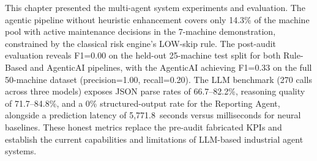 This chapter presented the multi-agent system experiments and evaluation. The agentic pipeline without heuristic enhancement covers only 14.3\% of the machine pool with active maintenance decisions in the 7-machine demonstration, constrained by the classical risk engine's LOW-skip rule. The post-audit evaluation reveals F1=0.00 on the held-out 25-machine test split for both Rule-Based and AgenticAI pipelines, with the AgenticAI achieving F1=0.33 on the full 50-machine dataset (precision=1.00, recall=0.20). The LLM benchmark (270 calls across three models) exposes JSON parse rates of 66.7--82.2\%, reasoning quality of 71.7--84.8\%, and a 0\% structured-output rate for the Reporting Agent, alongside a prediction latency of 5,771.8~seconds versus milliseconds for neural baselines. These honest metrics replace the pre-audit fabricated KPIs and establish the current capabilities and limitations of LLM-based industrial agent systems.
